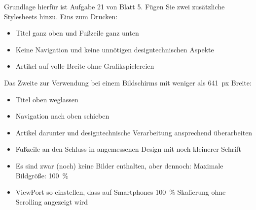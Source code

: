 %
\par Grundlage hierfür ist Aufgabe 21 von Blatt 5. Fügen Sie zwei zusätzliche Stylesheets hinzu. Eins zum Drucken:
%
\begin{itemize}
\item Titel ganz oben und Fußzeile ganz unten
\item Keine Navigation und keine unnötigen designtechnischen Aspekte
\item Artikel auf volle Breite ohne Grafikspielereien
\end{itemize}
%
\par Das Zweite zur Verwendung bei einem Bildschirms mit weniger als \qty{641}{px} Breite:
%
\begin{itemize}
\item Titel oben weglassen
\item Navigation nach oben schieben
\item Artikel darunter und designtechnische Verarbeitung ansprechend überarbeiten
\item Fußzeile an den Schluss in angemessenen Design mit noch kleinerer Schrift
\item Es sind zwar (noch) keine Bilder enthalten, aber dennoch: Maximale Bildgröße: \qty{100}{\%}
\item ViewPort so einstellen, dass auf Smartphones \qty{100}{\%} Skalierung ohne Scrolling angezeigt wird
\end{itemize}